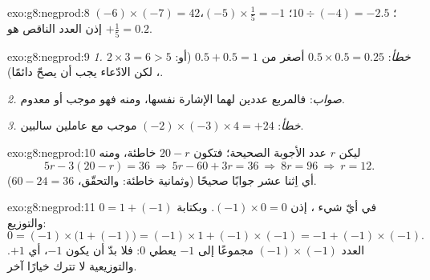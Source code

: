 \begin{solution}{exo:g8:negprod:8}
$(-6) \times (-7) = 42$؛ \quad
$10 \div (-4) = -2.5$؛ \quad
$(-5) \times \frac15 = -1$، إذن العدد الناقص هو
$+\frac15 = 0.2$.
\end{solution}

\begin{solution}{exo:g8:negprod:9}
\emph{1. خطأ}:  $0.5 \times 0.5 = 0.25$ أصغر من
$0.5 + 0.5 = 1$ (أو: $2 \times 3 = 6 > 5$، لكن الادّعاء يجب أن يصحّ
دائمًا).

\emph{2. صواب}: فالمربع  عددين لهما الإشارة
نفسها، ومنه فهو موجب أو معدوم.

\emph{3. خطأ}:  $(-2) \times (-3) \times 4 = +24$ موجب مع
عاملين سالبين.
\end{solution}

\begin{solution}{exo:g8:negprod:10}
ليكن $r$ عدد الأجوبة الصحيحة؛ فتكون $20 - r$ خاطئة، ومنه
\[
5r - 3(20 - r) = 36
\ \Longrightarrow\
5r - 60 + 3r = 36
\ \Longrightarrow\
8r = 96
\ \Longrightarrow\
r = 12 .
\]
أي اِثنا عشر جوابًا صحيحًا (وثمانية خاطئة: والتحقّق،
$60 - 24 = 36$).
\end{solution}

\begin{solution}{exo:g8:negprod:11}
 في أيّ شيء ، إذن $(-1) \times 0 = 0$. وبكتابة
$0 = 1 + (-1)$ والتوزيع:
\[
0 = (-1) \times \bigl(1 + (-1)\bigr)
= (-1) \times 1 + (-1) \times (-1)
= -1 + (-1) \times (-1).
\]
العدد $(-1) \times (-1)$ مجموعًا إلى $-1$ يعطي $0$: فلا بدّ أن يكون
 $-1$، أي $+1$. والتوزيعية لا تترك خيارًا
آخر.
\end{solution}

